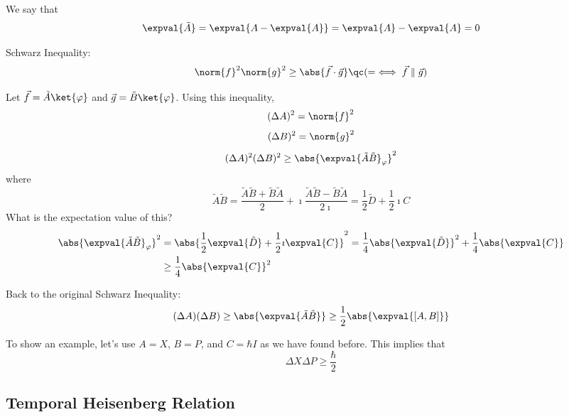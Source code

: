 \documentclass[a4paper,twoside,master.tex]{subfiles}
\begin{document}
We say that
\begin{equation}
    \expval{\tilde{A}} = \expval{A-\expval{A}}= \expval{A} - \expval{A} = 0
\end{equation}

\begin{theorem}
    Schwarz Inequality:
    \begin{equation}
        \norm{f}^2 \norm{g}^2 \geq \abs{ \vec{f} \cdot \vec{g}} \qc  (= \iff \vec{f} \parallel \vec{g})
    \end{equation}
\end{theorem}

Let $ \vec{f} = \tilde{A} \ket{\varphi} $ and $ \vec{g} = \tilde{B} \ket{\varphi} $. Using this inequality,
\begin{equation}
    (\Delta A)^2 = \norm{f}^2
\end{equation}
\begin{equation}
    (\Delta B)^2 = \norm{g}^2
\end{equation}
\begin{equation}
    (\Delta A)^2 (\Delta B)^2 \geq \abs{\expval{\tilde{A}\tilde{B}}_{\varphi}}^2
\end{equation}
where
\begin{equation}
    \tilde{A}\tilde{B} = \frac{\tilde{A}\tilde{B}+\tilde{B}\tilde{A}}{2} + \imath \frac{\tilde{A}\tilde{B}-\tilde{B}\tilde{A}}{2\imath} = \frac{1}{2} \tilde{D}+ \frac{1}{2} \imath C
\end{equation}
What is the expectation value of this?
\begin{align}
    \abs{\expval{\tilde{A}\tilde{B}}_{\varphi}}^2 &= \abs{\frac{1}{2} \expval{\tilde{D}} + \frac{1}{2} \imath \expval{C}}^2 = \frac{1}{4} \abs{\expval{\tilde{D}}}^2 + \frac{1}{4} \abs{\expval{C}}\\
    & \geq \frac{1}{4} \abs{\expval{C}}^2
\end{align}

Back to the original Schwarz Inequality:
\begin{equation}
    (\Delta A)(\Delta B) \geq \abs{\expval{\tilde{A}\tilde{B}}} \geq \frac{1}{2} \abs{\expval{[A,B]}}
\end{equation}

To show an example, let's use $ A = X $, $ B = P $, and $ C = \hbar I $ as we have found before. This implies that
\begin{equation}
    \Delta X \Delta P \geq \frac{\hbar}{2}
\end{equation}

\subsection{Temporal Heisenberg Relation}
\label{sub:temporal_heisenberg_relation}
\end{document}
